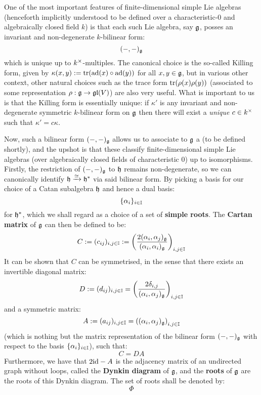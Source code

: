         One of the most important features of finite-dimensional simple Lie algebras (henceforth implicitly understood to be defined over a characteristic-$0$ and algebraically closed field $k$) is that each such Lie algebra, say $\mathfrak{g}$, posses an invariant and non-degenerate $k$-bilinear form:
            $$(-, -)_{\mathfrak{g}}$$
        which is unique up to $k^{\x}$-multiples. The canonical choice is the so-called Killing form, given by $\kappa(x, y) := \operatorname{tr}(\mathrm{ad}(x) \circ \mathrm{ad}(y))$ for all $x, y \in \mathfrak{g}$, but in various other context, other natural choices such as the trace form $\operatorname{tr}(\rho(x) \rho(y))$ (associated to some representation $\rho: \mathfrak{g} \to \mathfrak{gl}(V)$) are also very useful. What is important to us is that the Killing form is essentially unique: if $\kappa'$ is any invariant and non-degenerate symmetric $k$-bilinear form on $\mathfrak{g}$ then there will exist a \textit{unique} $c \in k^{\x}$ such that $\kappa' = c \kappa$.

        Now, such a bilinear form $(-, -)_{\mathfrak{g}}$ allows us to associate to $\mathfrak{g}$ a  (to be defined shortly), and the upshot is that these  classify finite-dimensional simple Lie algebras (over algebraically closed fields of characteristic $0$) up to isomorphisms. Firstly, the restriction of $(-, -)_{\mathfrak{g}}$ to $\mathfrak{h}$ remains non-degenerate, so we can canonically identify $\mathfrak{h} \xrightarrow[]{\simeq} \mathfrak{h}^*$ via said bilinear form. By picking a basis for our choice of a Catan subalgebra $\mathfrak{h}$ and hence a dual basis:
            $$\{\alpha_i\}_{i \in \mathbb{I}}$$
        for $\mathfrak{h}^*$, which we shall regard as a choice of a set of \textbf{simple roots}. The \textbf{Cartan matrix} of $\mathfrak{g}$ can then be defined to be:
            $$C := (c_{ij})_{i, j \in \mathbb{I}} := \left( \frac{2(\alpha_i, \alpha_j)_{\mathfrak{g}}}{(\alpha_i, \alpha_i)_{\mathfrak{g}}} \right)_{i, j \in \mathbb{I}}$$
        It can be shown that $C$ can be symmetrised, in the sense that there exists an invertible diagonal matrix:
            $$D := (d_{ij})_{i, j \in \mathbb{I}} = \left(\frac{2\delta_{i, j}}{(\alpha_i, \alpha_j)_{\mathfrak{g}}}\right)_{i, j \in \mathbb{I}}$$
        and a symmetric matrix:
            $$A := (a_{ij})_{i, j \in \mathbb{I}} = \left((\alpha_i, \alpha_j)_{\mathfrak{g}}\right)_{i, j \in \mathbb{I}}$$
        (which is nothing but the matrix representation of the bilinear form $(-, -)_{\mathfrak{g}}$ with respect to the basis $\{\alpha_i\}_{i \in \mathbb{I}}$), such that:
            $$C = DA$$
        Furthermore, we have that $2\mathrm{id} - A$ is the adjacency matrix of an undirected graph without loops, called the \textbf{Dynkin diagram} of $\mathfrak{g}$, and the \textbf{roots} of $\mathfrak{g}$ are the roots of this Dynkin diagram. The set of roots shall be denoted by:
            $$\Phi$$

